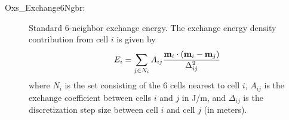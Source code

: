 \begin{description}
\item[Oxs\_Exchange6Ngbr:]
%
   Standard 6-neighbor exchange energy.  The
   exchange energy density contribution from cell $i$ is given by
   \begin{equation}
        E_i =  \sum_{j\in N_i} A_{ij}
         \frac{\textbf{m}_i\cdot\left(\textbf{m}_i - \textbf{m}_j\right)}{\Delta_{ij}^2}
   \label{eq:ExchangeEnergy}
   \end{equation}
   where $N_i$ is the set consisting of the 6 cells nearest to cell $i$,
   $A_{ij}$ is the exchange coefficient between cells $i$ and $j$ in J/m,
   and $\Delta_{ij}$ is the discretization step size between cell $i$ and
   cell $j$ (in meters).


\end{description}
